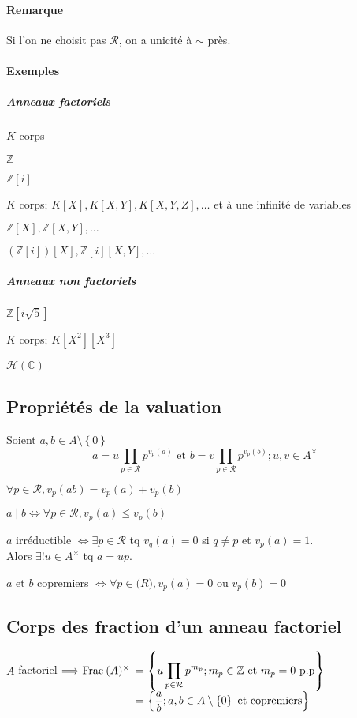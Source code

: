 \documentclass[reqno,a4paper,10pt]{report}
\makeatletter
\newcommand{\set}[1]{\left\lbrace #1 \right\rbrace} %
\newcommand{\Frac}{\mathrm{Frac}\:} %
\newcommand{\IZ}{\ensuremath{\mathbb{Z}}\xspace} %
\newcommand{\IC}{\ensuremath{\mathbb{C}}\xspace} %
\newcommand{\soo}{\Longrightarrow}
\let\olditemize=\itemize%
\renewenvironment{itemize}{%
    \olditemize%
  }{%
    \@noparlisttrue%
    \endlist%
  }%
\makeatother
\begin{document}
\paragraph{Remarque}
Si l'on ne choisit pas $\mathcal R$, on a unicité à $\sim$ près.

\paragraph{Exemples}
\subparagraph{Anneaux factoriels}
\begin{itemize}
  \item $K$ corps
  \item $\IZ$
  \item $\IZ[i]$
  \item $K$ corps; $K[X], K[X,Y], K[X,Y,Z], \dots$ et à une infinité de
    variables
  \item $\IZ[X], \IZ[X,Y], \dots$
  \item $(\IZ[i])[X], \IZ[i][X,Y],\dots$
\end{itemize}
\subparagraph{Anneaux non factoriels}
\begin{itemize}
  \item $\IZ[i\sqrt{5}]$
  \item $K$ corps; $K[X^2][X^3]$
  \item $\mathscr H(\IC)$
\end{itemize}

\subsection{Propriétés de la valuation}
Soient $a,b \in A\setminus\set{0}$
\[a = u\prod_{p\in \mathcal R} p^{v_p(a)} \text{ et } b=v\prod_{p\in \mathcal
R} p^{v_p(b)} ; u,v\in A^\times\]
\begin{itemize}
  \item $\forall p \in \mathcal R, v_p(ab)=v_p(a)+v_p(b)$
  \item $a \mid b \iff \forall p \in \mathcal R, v_p(a) \leq v_p(b)$
  \item $a$ irréductible $\iff \exists p \in \mathcal R$ tq $v_q(a)=0$ si
    $q\neq p$ et $v_p(a)=1$.\\
    Alors $\exists ! u \in A^\times$ tq $a=up$.
  \item $a$ et $b$ copremiers $\iff \forall p \in \mathcal(R), v_p(a) = 0$ ou
    $v_p(b)=0$
\end{itemize}

\subsection{Corps des fraction d'un anneau factoriel}
$A$ factoriel $\soo \Frac(A)^\times
\begin{array}[t]{l}
  \displaystyle =\set{u\prod_{p\in \mathcal R} p^{m_p}; m_p \in \IZ \text{
et } m_p = 0 \text{ p.p}}\\
\displaystyle =\set{\frac{a}{b}; a,b \in A\setminus\set{0} \text{ et
copremiers}}
\end{array}
$
\end{document}
